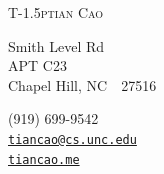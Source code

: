 \documentclass[line,margin]{res}
\begin{document}
	
	\begin{adjustwidth}{-1.3in}{}
		{\Huge
			{\textsc{%
					{T}\kern-1.5ptian
					{C}ao}
			}
		}
		\hfill\hfill\hfill
		{
			\begin{minipage}[b]{2in}
				 Smith Level Rd \\
				APT C23 \\ 
				Chapel Hill, NC~~27516
			\end{minipage}
			\hfill
			\begin{minipage}[b]{1.8in}
				\flushright %
				(919) 699-9542 \, \faPhone \\ 
				\texttt{\href{mailto:tiancao@cs.unc.edu}{tiancao@cs.unc.edu}}\, \faEnvelope \\
				\texttt{\href{http://tiancao.me/}{tiancao.me}}\, \faGlobe 
			\end{minipage}
		}\par
	\end{adjustwidth}  
	
	
\end{document}
